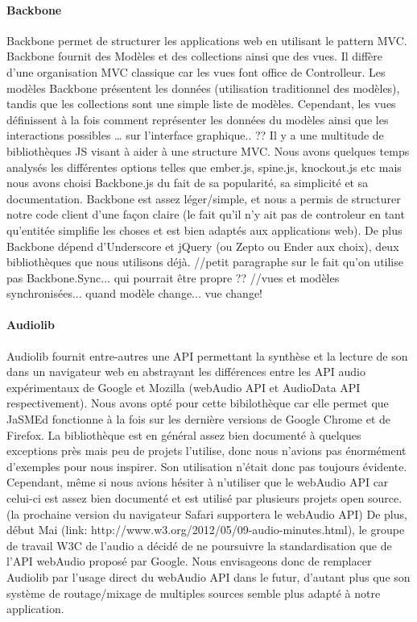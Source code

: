 \documentclass[pdftex,12pt,a4paper]{article}
\begin{document}
\paragraph{Backbone}
Backbone permet de structurer les applications web en utilisant le pattern MVC. Backbone fournit des Modèles et des collections ainsi que des vues. Il diffère d’une organisation MVC classique car les vues font office de Controlleur. Les modèles Backbone présentent les données (utilisation traditionnel des modèles), tandis que les collections sont une simple liste de modèles. Cependant, les vues définissent à la fois comment représenter les données du modèles ainsi que les interactions possibles … sur l’interface graphique.. ??
Il y a une multitude de bibliothèques JS visant à aider à une structure MVC. Nous avons quelques temps analysés les différentes options telles que ember.js, spine.js, knockout.js etc mais nous avons choisi Backbone.js du fait de sa popularité, sa simplicité et sa documentation. Backbone est assez léger/simple, et nous a permis de structurer notre code client d’une façon claire (le fait qu’il n’y ait pas de controleur en tant qu’entitée simplifie les choses et est bien adaptés aux applications web). De plus Backbone dépend d’Underscore et jQuery (ou Zepto ou Ender aux choix), deux bibliothèques que nous utilisons déjà.
//petit paragraphe sur le fait qu’on utilise pas Backbone.Sync... qui pourrait être propre ??
//vues et modèles synchronisées... quand modèle change... vue change!

\paragraph{Audiolib}
Audiolib fournit entre-autres une API permettant la synthèse et la lecture de son dans un navigateur web en abstrayant les différences entre les API audio expérimentaux de Google et Mozilla (webAudio API et AudioData API respectivement).
Nous avons opté pour cette bibilothèque car elle permet que JaSMEd fonctionne à la fois sur les dernière versions de Google Chrome et de Firefox.
La bibliothèque est en général assez bien documenté à quelques exceptions près mais peu de projets l’utilise, donc nous n’avions pas énormément d’exemples pour nous inspirer. Son utilisation n’était donc pas toujours évidente.
Cependant, même si  nous avions hésiter à n’utiliser que le webAudio API car celui-ci est assez bien documenté et est utilisé par plusieurs projets open source. (la prochaine version du navigateur Safari supportera le webAudio API)
De plus, début Mai (link: http://www.w3.org/2012/05/09-audio-minutes.html), le groupe de travail W3C de l’audio a décidé de ne poursuivre la standardisation que de l’API webAudio proposé par Google. Nous envisageons donc de remplacer Audiolib par l’usage direct du webAudio API dans le futur, d’autant plus que son système de routage/mixage de multiples sources semble plus adapté à notre application.
\end{document}
